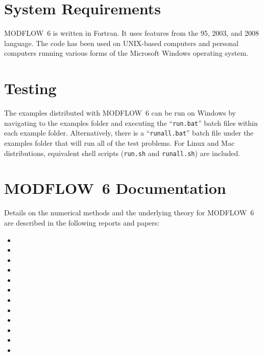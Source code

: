 \documentclass[11pt,twoside,twocolumn]{usgsreport}
\begin{document}
\section{System Requirements}
MODFLOW~6 is written in Fortran.  It uses features from the 95, 2003, and 2008 language.  The code has been used on UNIX-based computers and personal computers running various forms of the Microsoft Windows operating system.

\section{Testing}
The examples distributed with MODFLOW~6 can be run on Windows by navigating to the examples folder and executing the ``\texttt{run.bat}'' batch files within each example folder.  Alternatively, there is a ``\texttt{runall.bat}'' batch file under the examples folder that will run all of the test problems.  For Linux and Mac distributions, equivalent shell scripts (\texttt{run.sh} and \texttt{runall.sh}) are included.

\section{MODFLOW~6 Documentation}
Details on the numerical methods and the underlying theory for MODFLOW~6 are described in the following reports and papers:

\begin{itemize}

\item {}

\item {}

\item {}

\item {}

\item {}

\item {}

\item {}

\item {}

\item {}

\item {}

\item {}

\item {}

\end{itemize}
 
\end{document}
